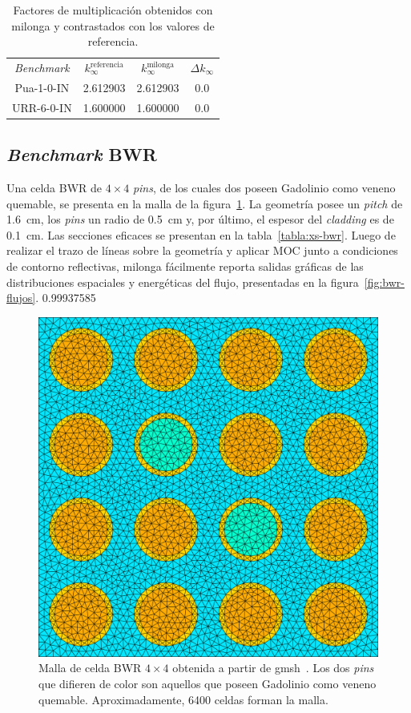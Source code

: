 \documentclass[11pt]{article}
\numberwithin{equation}{section}
\begin{document}
{
\begin{table}[h!]
\begin{center}
\begin{tabular}{cccc}
\emph{Benchmark}  & $k_{\infty}^{\text{referencia}}$ & $k_{\infty}^{\text{milonga}}$ & $\Delta  k_{\infty}$ \\
Pua-1-0-IN        & \num{2.612903}                       & \num{2.612903}                    & \num{0.0}     \\
URR-6-0-IN        & \num{1.600000}                       & \num{1.600000}                    & \num{0.0} 
\end{tabular}
\caption{\label{tabla:k-infty} Factores de multiplicación obtenidos con milonga y contrastados con los valores de referencia.}
\end{center}
\end{table}
}


\subsection{\emph{Benchmark} BWR}

Una celda BWR de $\num{4} \times \num{4}$ \emph{pins}, de los cuales dos poseen Gadolinio como veneno quemable, se presenta en la malla de la figura~\ref{fig:bwr-mesh}. La geometr\'ia posee un \emph{pitch} de \SI{1.6}{\centi\metre}, los \emph{pins} un radio de \SI{0.5}{\centi\metre} y, por \'ultimo, el espesor del \emph{cladding} es de \SI{0.1}{\centi\metre}. Las secciones eficaces se presentan en la tabla~\ref{tabla:xs-bwr}. Luego de realizar el trazo de l\'ineas sobre la geometr\'ia y aplicar MOC junto a condiciones de contorno reflectivas, milonga f\'acilmente reporta salidas gr\'aficas de las distribuciones espaciales y energ\'eticas del flujo, presentadas en la figura~\ref{fig:bwr-flujos}. 0.99937585

\begin{figure}[!h]
 \begin{center}
  \includegraphics[width=0.6\linewidth]{graficos/bwr-gadolinio/bwr-gadolinio.pdf}
 \end{center}
\caption{\label{fig:bwr-mesh} Malla de celda BWR $\num{4} \times \num{4}$ obtenida a partir de gmsh~\cite{gmsh}. Los dos \emph{pins} que difieren de color son aquellos que poseen Gadolinio como veneno quemable. Aproximadamente, \num{6400} celdas forman la malla.}
\end{figure}
\end{document}
